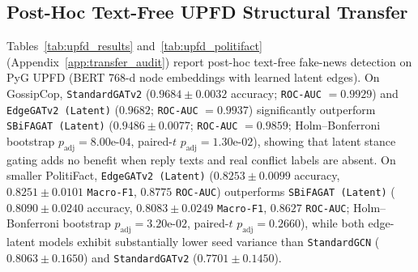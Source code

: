 \documentclass[conference]{IEEEtran}
\begin{document}
\subsection{Post-Hoc Text-Free UPFD Structural Transfer}
Tables~\ref{tab:upfd_results} and~\ref{tab:upfd_politifact} (Appendix~\ref{app:transfer_audit}) report post-hoc text-free fake-news detection on PyG UPFD (BERT 768-d node embeddings with learned latent edges). On GossipCop, \texttt{StandardGATv2} ($0.9684 \pm 0.0032$ accuracy; \texttt{ROC-AUC} $= 0.9929$) and \texttt{EdgeGATv2 (Latent)} ($0.9682$; \texttt{ROC-AUC} $= 0.9937$) significantly outperform \texttt{SBiFAGAT (Latent)} ($0.9486 \pm 0.0077$; \texttt{ROC-AUC} $= 0.9859$; Holm--Bonferroni bootstrap $p_{\text{adj}} = 8.00\text{e-}04$, paired-$t$ $p_{\text{adj}} = 1.30\text{e-}02$), showing that latent stance gating adds no benefit when reply texts and real conflict labels are absent. On smaller PolitiFact, \texttt{EdgeGATv2 (Latent)} ($0.8253 \pm 0.0099$ accuracy, $0.8251 \pm 0.0101$ \texttt{Macro-F1}, $0.8775$ \texttt{ROC-AUC}) outperforms \texttt{SBiFAGAT (Latent)} ($0.8090 \pm 0.0240$ accuracy, $0.8083 \pm 0.0249$ \texttt{Macro-F1}, $0.8627$ \texttt{ROC-AUC}; Holm--Bonferroni bootstrap $p_{\text{adj}} = 3.20\text{e-}02$, paired-$t$ $p_{\text{adj}} = 0.2660$), while both edge-latent models exhibit substantially lower seed variance than \texttt{StandardGCN} ($0.8063 \pm 0.1650$) and \texttt{StandardGATv2} ($0.7701 \pm 0.1450$).
\end{document}
